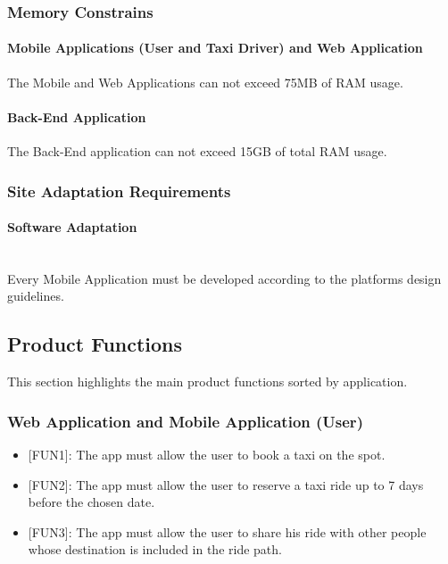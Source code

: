 \documentclass[12pt, a4paper]{article}
\begin{document}
\subsubsection{Memory Constrains} 

\label{ssub:memory_constrains}
\paragraph{Mobile Applications (User and Taxi Driver) and Web Application}
The Mobile and Web Applications can not exceed 75MB of RAM usage.
\paragraph{Back-End Application}
The Back-End application can not exceed 15GB of total RAM usage.

\subsubsection{Site Adaptation Requirements} 
\label{ssub:site_adaptation_requirements}
\paragraph{Software Adaptation} \mbox{} \\
Every Mobile Application must be developed according to the platforms design guidelines.

\subsection{Product Functions} 
\label{sub:product_functions}
This section highlights the main product functions sorted by application.

\subsubsection{Web Application and Mobile Application (User)}
\label{ssub:web_application_and_mobile_application_}
\begin{itemize}
	\item {[FUN1\label{itm:FUN1}]}: The app must allow the user to book a taxi on the spot.
	\item {[FUN2\label{itm:FUN2}]}: The app must allow the user to reserve a taxi ride up to 7 days before the chosen date.
	\item {[FUN3\label{itm:FUN3}]}: The app must allow the user to share his ride with other people whose destination is included in the ride path.
\end{itemize}
\end{document}
